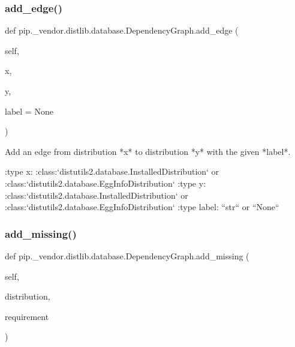 \subsubsection{\texorpdfstring{add\+\_\+edge()}{add\_edge()}}
{\footnotesize\ttfamily def pip.\+\_\+vendor.\+distlib.\+database.\+Dependency\+Graph.\+add\+\_\+edge (\begin{DoxyParamCaption}\item[{}]{self,  }\item[{}]{x,  }\item[{}]{y,  }\item[{}]{label = {\ttfamily None} }\end{DoxyParamCaption})}

\begin{DoxyVerb}Add an edge from distribution *x* to distribution *y* with the given
*label*.

:type x: :class:`distutils2.database.InstalledDistribution` or
 :class:`distutils2.database.EggInfoDistribution`
:type y: :class:`distutils2.database.InstalledDistribution` or
 :class:`distutils2.database.EggInfoDistribution`
:type label: ``str`` or ``None``
\end{DoxyVerb}
 \mbox{\label{classpip_1_1__vendor_1_1distlib_1_1database_1_1DependencyGraph_a372a05efe7243ce822e03da20181f7e6}} 
\subsubsection{\texorpdfstring{add\+\_\+missing()}{add\_missing()}}
{\footnotesize\ttfamily def pip.\+\_\+vendor.\+distlib.\+database.\+Dependency\+Graph.\+add\+\_\+missing (\begin{DoxyParamCaption}\item[{}]{self,  }\item[{}]{distribution,  }\item[{}]{requirement }\end{DoxyParamCaption})}

